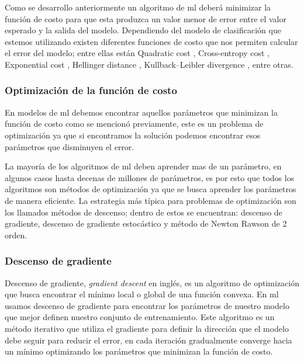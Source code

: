 Como se desarrollo anteriormente un algoritmo de \ac{ml} deberá minimizar la función de costo para que esta produzca un valor menor de error entre el valor esperado y la salida del modelo. Dependiendo del modelo de clasificación que estemos utilizando existen diferentes funciones de costo que nos permiten calcular el error del modelo; entre ellas están Quadratic cost \citep{quadratic_cost}, Cross-entropy cost \citep{cross_entropy}, Exponential cost \citep{exponential_cost}, Hellinger distance \citep{Hellinger}, Kullback–Leibler divergence \citep{kullback}, entre otras.


\subsubsection{Optimización de la función de costo} 
En modelos de \ac{ml} debemos encontrar aquellos parámetros que minimizan la función de costo como se mencionó previamente, este es un problema de optimización ya que si encontramos la solución podemos encontrar esos parámetros que disminuyen el error.

La mayoría de los algoritmos de \ac{ml} deben aprender mas de un parámetro, en algunos casos hasta decenas de millones de parámetros, es por esto que todos los algoritmos  son métodos de optimización ya que se busca aprender los parámetros de manera eficiente. La estrategia más típica para problemas de optimización son los llamados métodos de descenso; dentro de estos se encuentran: descenso de gradiente, descenso de gradiente estocástico y método de Newton Rawson de 2 orden.

\subsubsection{Descenso de gradiente}\label{sub:gradient-desc}
Descenso de gradiente, \textit{gradient descent} en inglés, es un algoritmo de optimización que busca encontrar el mínimo local o global de una función convexa.  En \ac{ml} usamos descenso de gradiente para encontrar los parámetros de nuestro modelo que mejor definen nuestro conjunto de entrenamiento. Este algoritmo es un método iterativo que utiliza el gradiente para definir la dirección que el modelo debe seguir para reducir el error, en cada iteración gradualmente converge hacia un mínimo optimizando los parámetros que minimizan la función de costo. 


